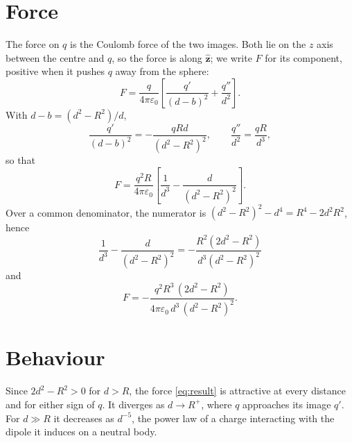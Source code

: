 \documentclass{article}
\begin{document}
\section{Force}
The force on $q$ is the Coulomb force of the two images. Both lie on the $z$ axis between the centre and $q$, so the force is along $\hat{\mathbf z}$; we write $F$ for its component, positive when it pushes $q$ away from the sphere:
\begin{equation}
  F = \frac{q}{4\pi\varepsilon_0}\left[\frac{q'}{(d-b)^2} + \frac{q''}{d^2}\right] .
  \label{eq:force}
\end{equation}
With $d - b = (d^2 - R^2)/d$,
\begin{equation}
  \frac{q'}{(d-b)^2} = -\frac{qRd}{(d^2-R^2)^2}, \qquad \frac{q''}{d^2} = \frac{qR}{d^3},
  \label{eq:terms}
\end{equation}
so that
\begin{equation}
  F = \frac{q^2 R}{4\pi\varepsilon_0}\left[\frac{1}{d^3} - \frac{d}{(d^2-R^2)^2}\right] .
  \label{eq:force2}
\end{equation}
Over a common denominator, the numerator is $(d^2 - R^2)^2 - d^4 = R^4 - 2d^2R^2$, hence
\begin{equation}
  \frac{1}{d^3} - \frac{d}{(d^2-R^2)^2} = -\frac{R^2(2d^2 - R^2)}{d^3(d^2-R^2)^2}
  \label{eq:combine}
\end{equation}
and
\begin{equation}
  F = -\frac{q^2 R^3\,(2d^2 - R^2)}{4\pi\varepsilon_0\, d^3\,(d^2 - R^2)^2} .
  \label{eq:result}
\end{equation}

\section{Behaviour}
Since $2d^2 - R^2 > 0$ for $d > R$, the force \eqref{eq:result} is attractive at every distance and for either sign of $q$. It diverges as $d \to R^+$, where $q$ approaches its image $q'$. For $d \gg R$ it decreases as $d^{-5}$, the power law of a charge interacting with the dipole it induces on a neutral body.
\end{document}
